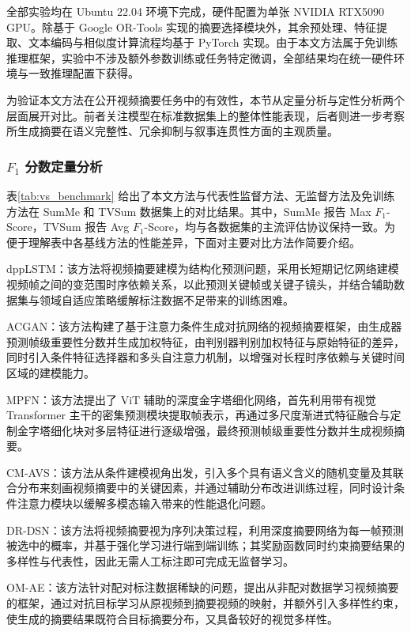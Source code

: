 全部实验均在 Ubuntu 22.04 环境下完成，硬件配置为单张 NVIDIA RTX5090 GPU。除基于 Google OR-Tools 实现的摘要选择模块外，其余预处理、特征提取、文本编码与相似度计算流程均基于 PyTorch 实现。由于本文方法属于免训练推理框架，实验中不涉及额外参数训练或任务特定微调，全部结果均在统一硬件环境与一致推理配置下获得。

为验证本文方法在公开视频摘要任务中的有效性，本节从定量分析与定性分析两个层面展开对比。前者关注模型在标准数据集上的整体性能表现，后者则进一步考察所生成摘要在语义完整性、冗余抑制与叙事连贯性方面的主观质量。

\subsubsection{$F_1$ 分数定量分析}
表\ref{tab:vs_benchmark} 给出了本文方法与代表性监督方法、无监督方法及免训练方法在 SumMe 和 TVSum 数据集上的对比结果。其中，SumMe 报告 Max $F_1$-Score，TVSum 报告 Avg $F_1$-Score，均与各数据集的主流评估协议保持一致。为便于理解表中各基线方法的性能差异，下面对主要对比方法作简要介绍。

dppLSTM\cite{zhang2016video}：该方法将视频摘要建模为结构化预测问题，采用长短期记忆网络建模视频帧之间的变范围时序依赖关系，以此预测关键帧或关键子镜头，并结合辅助数据集与领域自适应策略缓解标注数据不足带来的训练困难。

ACGAN\cite{he2019unsupervised}：该方法构建了基于注意力条件生成对抗网络的视频摘要框架，由生成器预测帧级重要性分数并生成加权特征，由判别器判别加权特征与原始特征的差异，同时引入条件特征选择器和多头自注意力机制，以增强对长程时序依赖与关键时间区域的建模能力。

MPFN\cite{khan2024deep}：该方法提出了 ViT 辅助的深度金字塔细化网络，首先利用带有视觉 Transformer 主干的密集预测模块提取帧表示，再通过多尺度渐进式特征融合与定制金字塔细化块对多层特征进行逐级增强，最终预测帧级重要性分数并生成视频摘要。

CM-AVS\cite{huang2026conditional}：该方法从条件建模视角出发，引入多个具有语义含义的随机变量及其联合分布来刻画视频摘要中的关键因素，并通过辅助分布改进训练过程，同时设计条件注意力模块以缓解多模态输入带来的性能退化问题。

DR-DSN\cite{zhou2018deep}：该方法将视频摘要视为序列决策过程，利用深度摘要网络为每一帧预测被选中的概率，并基于强化学习进行端到端训练；其奖励函数同时约束摘要结果的多样性与代表性，因此无需人工标注即可完成无监督学习。

OM-AE\cite{rochan2019video}：该方法针对配对标注数据稀缺的问题，提出从非配对数据学习视频摘要的框架，通过对抗目标学习从原视频到摘要视频的映射，并额外引入多样性约束，使生成的摘要结果既符合目标摘要分布，又具备较好的视觉多样性。

